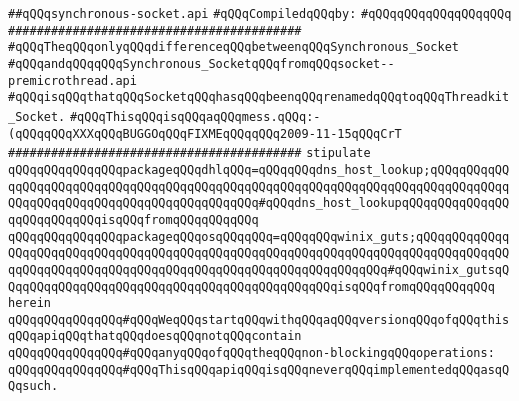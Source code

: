 \label{src/lib/std/src/socket/synchronous-socket.api}
\verb|##qQQqsynchronous-socket.api|\newline
\newline
\verb|#qQQqCompiledqQQqby:|\newline
\verb|#qQQqqQQqqQQqqQQqqQQq|\newline
\newline
\verb|#########################################|\newline
\verb|#qQQqTheqQQqonlyqQQqdifferenceqQQqbetweenqQQqSynchronous_Socket|\newline
\verb|#qQQqandqQQqqQQqSynchronous_SocketqQQqfromqQQqsocket--premicrothread.api|\newline
\verb|#qQQqisqQQqthatqQQqSocketqQQqhasqQQqbeenqQQqrenamedqQQqtoqQQqThreadkit_Socket.|\newline
\verb|#qQQqThisqQQqisqQQqaqQQqmess.qQQq:-(qQQqqQQqXXXqQQqBUGGOqQQqFIXMEqQQqqQQq2009-11-15qQQqCrT|\newline
\verb|#########################################|\newline
\newline
\verb|stipulate|\newline
\verb|qQQqqQQqqQQqqQQqpackageqQQqdhlqQQq=qQQqqQQqdns_host_lookup;qQQqqQQqqQQqqQQqqQQqqQQqqQQqqQQqqQQqqQQqqQQqqQQqqQQqqQQqqQQqqQQqqQQqqQQqqQQqqQQqqQQqqQQqqQQqqQQqqQQqqQQqqQQqqQQqqQQq#qQQqdns_host_lookupqQQqqQQqqQQqqQQqqQQqqQQqqQQqisqQQqfromqQQqqQQqqQQq|\newline
\verb|qQQqqQQqqQQqqQQqpackageqQQqosqQQqqQQq=qQQqqQQqwinix_guts;qQQqqQQqqQQqqQQqqQQqqQQqqQQqqQQqqQQqqQQqqQQqqQQqqQQqqQQqqQQqqQQqqQQqqQQqqQQqqQQqqQQqqQQqqQQqqQQqqQQqqQQqqQQqqQQqqQQqqQQqqQQqqQQqqQQqqQQq#qQQqwinix_gutsqQQqqQQqqQQqqQQqqQQqqQQqqQQqqQQqqQQqqQQqqQQqqQQqisqQQqfromqQQqqQQqqQQq|\newline
\verb|herein|\newline
\newline
\verb|qQQqqQQqqQQqqQQq#qQQqWeqQQqstartqQQqwithqQQqaqQQqversionqQQqofqQQqthisqQQqapiqQQqthatqQQqdoesqQQqnotqQQqcontain|\newline
\verb|qQQqqQQqqQQqqQQq#qQQqanyqQQqofqQQqtheqQQqnon-blockingqQQqoperations:|\newline
\newline
\verb|qQQqqQQqqQQqqQQq#qQQqThisqQQqapiqQQqisqQQqneverqQQqimplementedqQQqasqQQqsuch.|\newline
